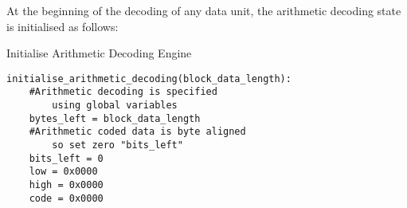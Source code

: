 At the beginning of the decoding of any data unit, the arithmetic
decoding state is initialised as follows:

Initialise Arithmetic Decoding Engine
\begin{verbatim}
initialise_arithmetic_decoding(block_data_length):
    #Arithmetic decoding is specified
        using global variables
    bytes_left = block_data_length
    #Arithmetic coded data is byte aligned
        so set zero "bits_left"
    bits_left = 0
    low = 0x0000
    high = 0x0000
    code = 0x0000
\end{verbatim}
